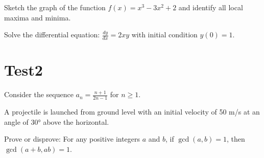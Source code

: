 \documentclass[12pt]{exam}
\begin{document}
\begin{questions}
\question Sketch the graph of the function $f(x) = x^3 - 3x^2 + 2$ and identify all local maxima and minima.

\question Solve the differential equation: $\frac{dy}{dx} = 2xy$ with initial condition $y(0) = 1$.

\section{Test2}
\question Consider the sequence $a_n = \frac{n+1}{2n-1}$ for $n \geq 1$.

\question A projectile is launched from ground level with an initial velocity of 50 m/s at an angle of 30° above the horizontal.

\question Prove or disprove: For any positive integers $a$ and $b$, if $\gcd(a,b) = 1$, then $\gcd(a+b, ab) = 1$.

\end{questions}
\end{document}
